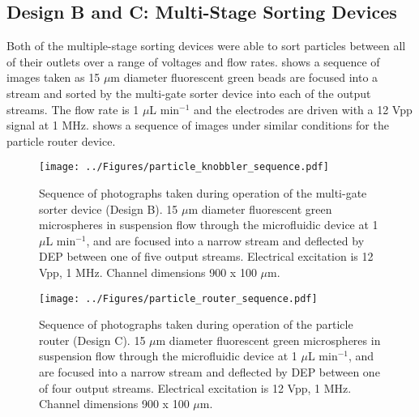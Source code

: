 \subsection{Design B and C: Multi-Stage Sorting Devices}

Both of the multiple-stage sorting devices were able to sort particles between all of their outlets over a range of voltages and flow rates.  shows a sequence of images taken as 15 $\mu$m diameter fluorescent green beads are focused into a stream and sorted by the multi-gate sorter device into each of the output streams. The flow rate is 1 $\mu$L min$^{-1}$ and the electrodes are driven with a 12 Vpp signal at 1 MHz.  shows a sequence of images under similar conditions for the particle router device.

\begin{figure}[p]
 \centering
 \texttt{[image: ../Figures/particle\_knobbler\_sequence.pdf]}
 \caption[Sequence of photographs taken during operation of the multi-gate sorter device (Design B).]{Sequence of photographs taken during operation of the multi-gate sorter device (Design B). 15 $\mu$m diameter fluorescent green microspheres in suspension flow through the microfluidic device at 1 $\mu$L min$^{-1}$, and are focused into a narrow stream and deflected by DEP between one of five output streams. Electrical excitation is 12 Vpp, 1 MHz. Channel dimensions 900 x 100 $\mu$m.}
 \label{fig:particle_knobbler_sequence}
\end{figure}

\begin{figure}[p]
 \centering
 \texttt{[image: ../Figures/particle\_router\_sequence.pdf]}
 \caption[Sequence of photographs taken during operation of the particle router (Design C).]{Sequence of photographs taken during operation of the particle router (Design C). 15 $\mu$m diameter fluorescent green microspheres in suspension flow through the microfluidic device at 1 $\mu$L min$^{-1}$, and are focused into a narrow stream and deflected by DEP between one of four output streams. Electrical excitation is 12 Vpp, 1 MHz. Channel dimensions 900 x 100 $\mu$m.}
 \label{fig:particle_router_sequence}
\end{figure}

